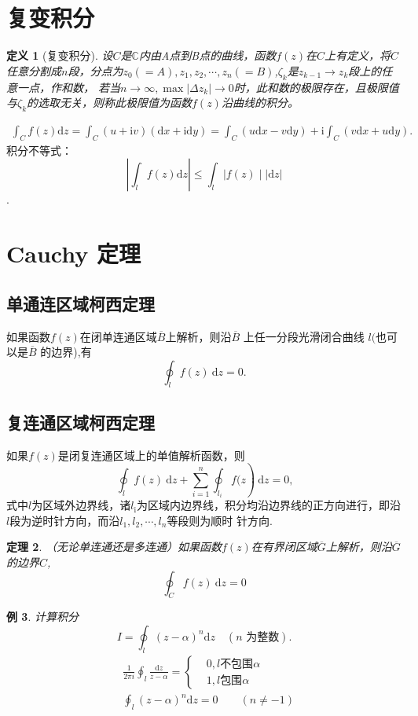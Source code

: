 \documentclass[11pt, a4paper, twoside]{ctexbook}
\newtheorem{theorem}{定理}[section]
\newtheorem{definition}[theorem]{定义}
\newtheorem{example}[theorem]{例}
\begin{document}
\section{复变积分}
\begin{definition}[复变积分]
  设$C$是$\mathbb{C}$内由A点到B点的曲线，函数$f(z)$在$C$上有定义，将$C$任意分割成$n$段，分点为$z_0(= A),z_1,z_2,\cdots,z_n(=B)$,$\zeta_k$是$z_{k-1} \to z_{k}$段上的任意一点，作和数，
若当$n\to\infty, \max|\Delta z_k|\to 0$时，此和数的极限存在，且极限值与$\zeta_k$的选取无关，则称此极限值为函数$f(z)$沿曲线的积分。
\end{definition}
$$\begin{aligned}\int_Cf(z)\mathrm{d}z=\int_C\left(u+\mathrm{i}v\right)\left(\mathrm{d}x+\mathrm{i}\mathrm{d}y\right)=\int_C\left(u\mathrm{d}x-v\mathrm{d}y\right)+\mathrm{i}\int_C\left(v\mathrm{d}x+u\mathrm{d}y\right).\end{aligned}$$
积分不等式：$$\left|\int_lf(z)\mathrm{d}z\right|\leqslant\int_l\left|f(z)\mid\mid\mathrm{d}z\right|$$.

\section{Cauchy 定理}
\subsection{单通连区域柯西定理}
如果函数$f(z)$在闭单连通区域$\overline{B}$上解析，则沿$\overline{B}$ 上任一分段光滑闭合曲线 $l( $也可以是$\overline B$ 的边界),有
$$
\oint_lf(z)\mathrm{~d}z=0.
$$
\subsection{复连通区域柯西定理}
如果$f(z)$是闭复连通区域上的单值解析函数，则
$$
\oint_lf(z)\mathrm{~d}z+\sum_{i\operatorname{=}1}^n\oint_{l_i}f(z\operatorname{)}\mathrm{~d}z=0\text{,}
$$
式中$l$为区域外边界线，诸$l_\mathrm{i}$为区域内边界线，积分均沿边界线的正方向进行，即沿$l$段为逆时针方向，而沿$l_1,l_2,\cdots,l_n$等段则为顺时
针方向.

\begin{theorem}
    （无论单连通还是多连通）如果函数$f(z)$在有界闭区域$\overline{G}$上解析，则沿$\overline{G}$的边界$C$,
    $$\boxed{\oint_C f(z) \mathrm{~d}z = 0}$$
\end{theorem}
\begin{example}
    计算积分$$I=\oint_{l}\left(z-\alpha\right)^{n}\mathrm{d}z\quad(n\text{ 为整数}).$$
    $$\begin{aligned}
    &\frac{1}{2\pi i }\oint_l \frac{\mathrm{d} z}{z - \alpha} = \begin{cases}&0, l\text{不包围}\alpha\\&1, l\text{包围}\alpha\end{cases}\\
    &\oint_l (z-\alpha)^n \mathrm{d}z = 0 \qquad(n \ne -1)
    \end{aligned} $$
\end{example}
\end{document}

